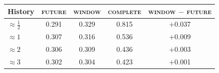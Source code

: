 \begin{tabular}{lcccc}
\toprule
History & \textsc{future} & \textsc{window} & \textsc{complete} & \textsc{window} $-$ \textsc{future} \\
\midrule
$\approx\frac12$ & 0.291 & 0.329 & 0.815 & $+$0.037 \\
$\approx 1$ & 0.307 & 0.316 & 0.536 & $+$0.009 \\
$\approx 2$ & 0.306 & 0.309 & 0.436 & $+$0.003 \\
$\approx 3$ & 0.302 & 0.304 & 0.423 & $+$0.001 \\
\bottomrule
\end{tabular}
